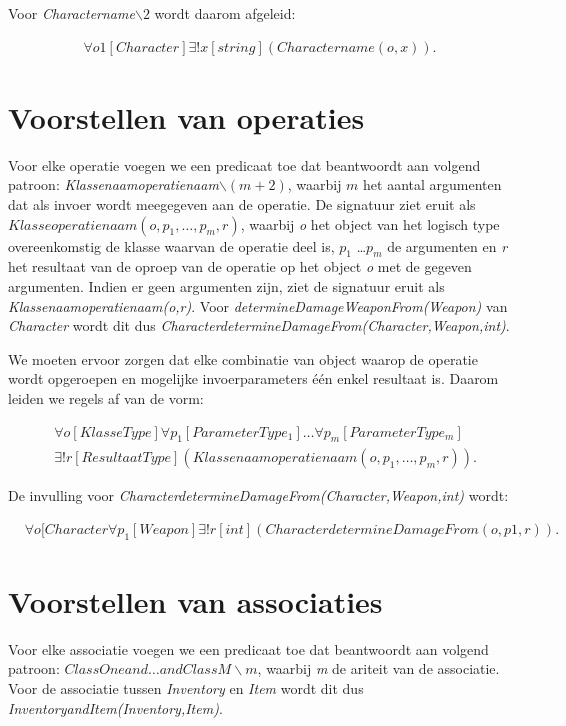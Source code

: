 Voor \textit{Charactername$\backslash2$} wordt daarom afgeleid:
	
\begin{align*}
	\forall{o1}[Character]\exists!{x}[string](Charactername(o,x)).
\end{align*}

\section{Voorstellen van operaties}
Voor elke operatie voegen we een predicaat toe dat beantwoordt aan volgend patroon: \textit{Klassenaamoperatienaam$\backslash(m+2)$}, waarbij $m$ het aantal argumenten dat als invoer wordt meegegeven aan de operatie. De signatuur ziet eruit als \\ \textit{$Klasseoperatienaam(o,p_1,\ldots,p_m,r)$}, waarbij \textit{o} het object van het logisch type overeenkomstig de klasse waarvan de operatie deel is, \textit{$p_1$} \ldots \textit{$p_m$} de argumenten en \textit{r} het resultaat van de oproep van de operatie op het object \textit{o} met de gegeven argumenten. Indien er geen argumenten zijn, ziet de signatuur eruit als \textit{Klassenaamoperatienaam(o,r)}. Voor \textit{determineDamageWeaponFrom(Weapon)} van \textit{Character} wordt dit dus \textit{CharacterdetermineDamageFrom(Character,Weapon,int)}.

We moeten ervoor zorgen dat elke combinatie van object waarop de operatie wordt opgeroepen en mogelijke invoerparameters \'e\'en enkel resultaat is. Daarom leiden we regels af van de vorm:

\begin{align*}
	&\forall{o}[KlasseType]\forall{p_1}[ParameterType_1]\ldots\forall{p_m}[ParameterType_m]
	\\
	&\exists!{r}[ResultaatType](Klassenaamoperatienaam(o,p_1,\ldots,p_m,r)).
\end{align*}
	
De invulling voor \textit{CharacterdetermineDamageFrom(Character,Weapon,int)} wordt:
	
\begin{align*}
	&\forall{o}[Character\forall{p_1}[Weapon]\exists!{r}[int](CharacterdetermineDamageFrom(o,p1,r)).
\end{align*}

\section{Voorstellen van associaties}
Voor elke associatie voegen we een predicaat toe dat beantwoordt aan volgend patroon: \textit{$ClassOneand\ldots{}andClassM\backslash{m}$}, waarbij \textit{m} de ariteit van de associatie. Voor de associatie tussen \textit{Inventory} en \textit{Item} wordt dit dus \textit{InventoryandItem(Inventory,Item)}.

